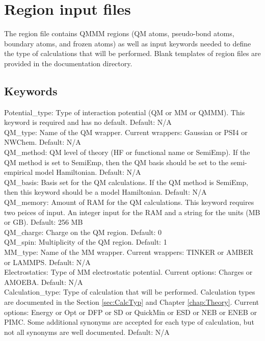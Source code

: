 \documentclass[12pt]{report}
\begin{document}
\section{Region input files}

The region file contains QMMM regions (QM atoms, pseudo-bond atoms, boundary
atoms, and frozen atoms) as well as input keywords needed to define the
type of calculations that will be performed.
Blank templates of region files are provided in the documentation
directory. \\

\subsection{Keywords}

Potential\_type: Type of interaction potential (QM or MM or QMMM).
This keyword is required and has no default.
Default: N/A \\

QM\_type: Name of the QM wrapper.
Current wrappers: Gaussian or PSI4 or NWChem.
Default: N/A \\

QM\_method: QM level of theory (HF or functional name or SemiEmp).
If the QM method is set to SemiEmp, then the QM basis should be set to the
semi-empirical model Hamiltonian.
Default: N/A \\

QM\_basis: Basis set for the QM calculations.
If the QM method is SemiEmp, then this keyword should be a model Hamiltonian.
Default: N/A \\

QM\_memory: Amount of RAM for the QM calculations.
This keyword requires two peices of input.
An integer input for the RAM and a string for the units (MB or GB).
Default: 256 MB \\

QM\_charge: Charge on the QM region.
Default: 0 \\

QM\_spin: Multiplicity of the QM region.
Default: 1 \\

MM\_type: Name of the MM wrapper.
Current wrappers: TINKER or AMBER or LAMMPS.
Default: N/A \\

Electrostatics: Type of MM electrostatic potential.
Current options: Charges or AMOEBA.
Default: N/A \\

Calculation\_type: Type of calculation that will be performed.
Calculation types are documented in the Section \ref{sec:CalcTyp} and
Chapter \ref{chap:Theory}.
Current options: Energy or Opt or DFP or SD or QuickMin or ESD or NEB or
ENEB or PIMC.
Some additional synonyms are accepted for each type of calculation, but not
all synonyms are well documented.
Default: N/A \\
\end{document}

